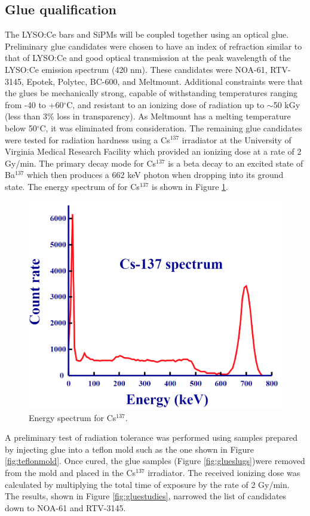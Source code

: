 \subsection{Glue qualification}
The LYSO:Ce bars and SiPMs will be coupled together using an optical glue.  Preliminary glue candidates were chosen to have an index of refraction similar to that of LYSO:Ce and good optical transmission at the peak wavelength of the LYSO:Ce emission spectrum (420 nm).  These candidates were NOA-61, RTV-3145, Epotek, Polytec, BC-600, and Meltmount.  Additional constraints were that the glues be mechanically strong, capable of withstanding temperatures ranging from -40 to +60$^\circ$C, and resistant to an ionizing dose of radiation up to $\sim$50 kGy (less than 3\% loss in transparency).  As Meltmount has a melting temperature below 50$^\circ$C, it was eliminated from consideration.  The remaining glue candidates were tested for radiation hardness using a Cs$^{137}$ irradiator at the University of Virginia Medical Research Facility which provided an ionizing dose at a rate of 2 Gy/min.  The primary decay mode for Cs$^{137}$ is a beta decay to an excited state of Ba$^{137}$ which then produces a 662 keV photon when dropping into its ground state.  The energy spectrum of for Cs$^{137}$ is shown in Figure \ref{fig:caesium-137gammarayspectrum-en}.
\begin{figure}[h]
	\centering
	\includegraphics[width=0.7\linewidth]{Figures/Caesium-137_Gamma_Ray_Spectrum-en}
	\caption[Energy spectrum for Cs$^{137}$.]{Energy spectrum for Cs$^{137}$.}
	\label{fig:caesium-137gammarayspectrum-en}
\end{figure}
A preliminary test of radiation tolerance was performed using samples prepared by injecting glue into a teflon mold such as the one shown in Figure \ref{fig:teflonmold}.  Once cured, the glue samples (Figure \ref{fig:glueslugs})were removed from the mold and placed in the Cs$^{137}$ irradiator.  The received ionizing dose was calculated by multiplying the total time of exposure by the rate of 2 Gy/min.  The results, shown in Figure \ref{fig:gluestudies}, narrowed the list of candidates down to NOA-61 and RTV-3145.


